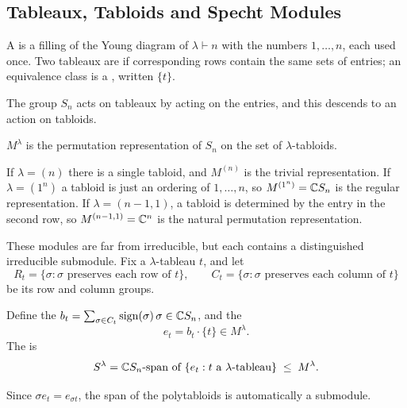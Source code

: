 \documentclass[a4paper]{scrartcl}
\begin{document}
\subsection{Tableaux, Tabloids and Specht Modules}

\begin{definition}
	A  is a filling of the Young diagram of $\lambda\vdash n$ with the numbers $1,\dots,n$, each used once. Two tableaux are  if corresponding rows contain the same sets of entries; an equivalence class is a , written $\{t\}$.
\end{definition}

The group $S_n$ acts on tableaux by acting on the entries, and this descends to an action on tabloids.

\begin{definition}
	$M^\lambda$ is the permutation representation of $S_n$ on the set of $\lambda$-tabloids.
\end{definition}

\begin{example}
	If $\lambda = (n)$ there is a single tabloid, and $M^{(n)}$ is the trivial representation. If $\lambda = (1^n)$ a tabloid is just an ordering of $1,\dots,n$, so $M^{(1^n)} = \mathbb{C} S_n$ is the regular representation. If $\lambda = (n-1,1)$, a tabloid is determined by the entry in the second row, so $M^{(n-1,1)} = \mathbb{C}^n$ is the natural permutation representation.
\end{example}

These modules are far from irreducible, but each contains a distinguished irreducible submodule. Fix a $\lambda$-tableau $t$, and let
$$R_t = \{\sigma : \sigma \text{ preserves each row of } t\}, \qquad C_t = \{\sigma : \sigma\text{ preserves each column of } t\}$$
be its row and column groups.

\begin{definition}
	Define the  $b_t = \sum_{\sigma\in C_t}\operatorname{sign}(\sigma)\,\sigma \in \mathbb{C} S_n$, and the 
	$$e_t = b_t\cdot\{t\} \in M^\lambda.$$
	The  is
	$$S^\lambda = \mathbb{C} S_n\text{-span of } \{e_t : t \text{ a }\lambda\text{-tableau}\} \; \leq \; M^\lambda.$$
\end{definition}

Since $\sigma e_t = e_{\sigma t}$, the span of the polytabloids is automatically a submodule.
\end{document}
